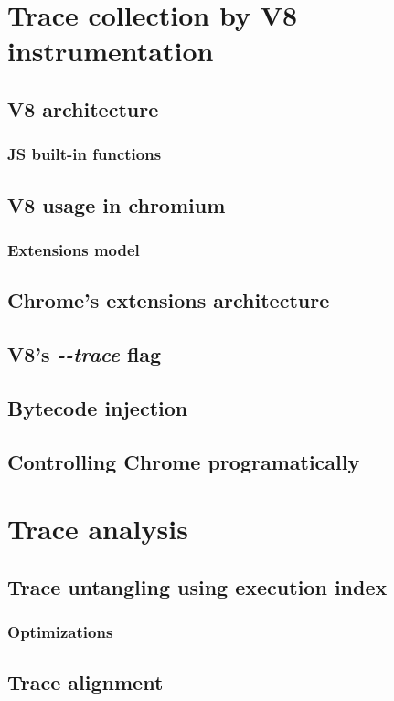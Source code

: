 \documentclass[en]{pracamgr}
\begin{document}
\chapter{Trace collection by V8 instrumentation}
\section{V8 architecture}
\subsection{JS built-in functions}
\section{V8 usage in chromium}
\label{v8-in-chrome}

\subsection{Extensions model}
\section{Chrome's extensions architecture}
\section{V8's \emph{-{}-trace} flag}
\section{Bytecode injection}
\section{Controlling Chrome programatically}

\chapter{Trace analysis}
\section{Trace untangling using execution index}
\subsection{Optimizations}

\section{Trace alignment}
\label{trace-alignment}
\end{document}

